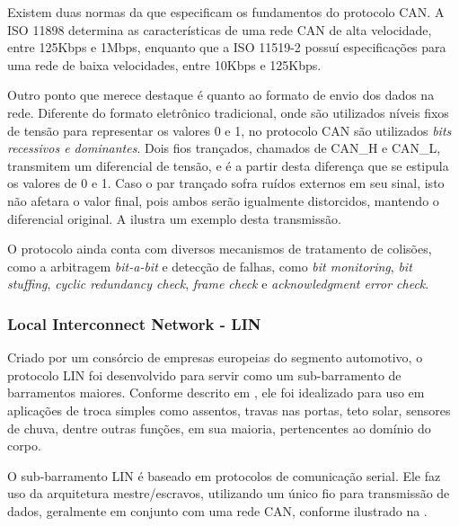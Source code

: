 Existem duas normas da  que especificam os fundamentos do protocolo CAN. A ISO 11898 determina as características de uma rede CAN de alta velocidade, entre 125Kbps e 1Mbps, enquanto que a ISO 11519-2 possuí especificações para uma rede de baixa velocidades, entre 10Kbps e 125Kbps.

Outro ponto que merece destaque é quanto ao formato de envio dos dados na rede. Diferente do formato eletrônico tradicional, onde são utilizados níveis fixos de tensão para representar os valores 0 e 1, no protocolo CAN são utilizados \emph{bits recessivos e dominantes}. Dois fios trançados, chamados de CAN\_H e CAN\_L, transmitem um diferencial de tensão, e é a partir desta diferença que se estipula os valores de 0 e 1. Caso o par trançado sofra ruídos externos em seu sinal, isto não afetara o valor final, pois ambos serão igualmente distorcidos, mantendo o diferencial original. A  ilustra um exemplo desta transmissão.


O protocolo ainda conta com diversos mecanismos de tratamento de colisões, como a arbitragem \emph{bit-a-bit} e detecção de falhas, como \emph{bit monitoring}, \emph{bit stuffing}, \emph{cyclic redundancy check}, \emph{frame check} e \emph{acknowledgment error check}.

\subsubsection{Local Interconnect Network - LIN}
\label{cap:rede_lin}

Criado por um consórcio de empresas europeias do segmento automotivo, o protocolo LIN foi desenvolvido para servir como um sub-barramento de barramentos maiores. Conforme descrito em , ele foi idealizado para uso em aplicações de troca simples como assentos, travas nas portas, teto solar, sensores de chuva, dentre outras funções, em sua maioria, pertencentes ao domínio do corpo.

O sub-barramento LIN é baseado em protocolos de comunicação serial. Ele faz uso da arquitetura mestre/escravos, utilizando um único fio para transmissão de dados, geralmente em conjunto com uma rede CAN, conforme ilustrado na .



